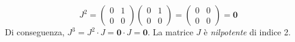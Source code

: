 \begin{solbox}
$$ J^2 = \begin{pmatrix} 0 & 1 \\ 0 & 0 \end{pmatrix} \begin{pmatrix} 0 & 1 \\ 0 & 0 \end{pmatrix} = \begin{pmatrix} 0 & 0 \\ 0 & 0 \end{pmatrix} = \mathbf{0} $$
Di conseguenza, $J^3 = J^2 \cdot J = \mathbf{0} \cdot J = \mathbf{0}$.
La matrice $J$ è \textit{nilpotente} di indice 2.
\end{solbox}
